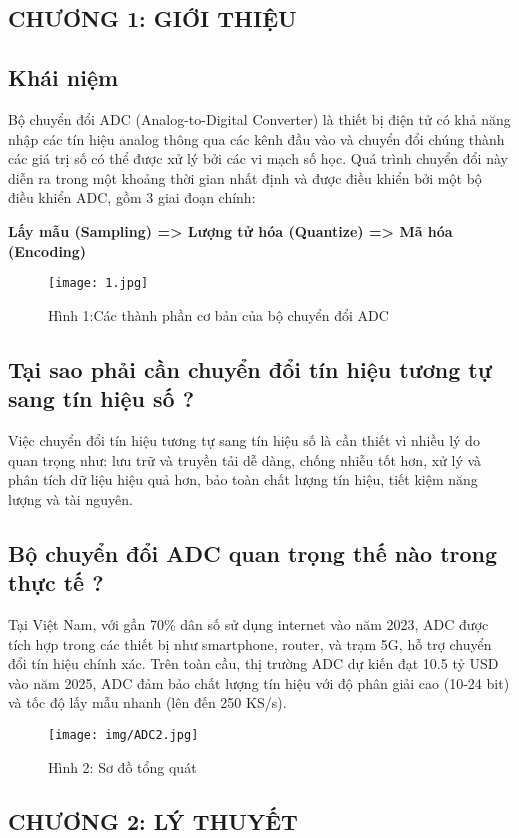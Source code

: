 \documentclass[a4paper,13pt]{article}
\begin{document}
\begin{center}
    \section{CHƯƠNG 1: GIỚI THIỆU}
\end{center}
\subsection{Khái niệm}
Bộ chuyển đổi ADC (Analog-to-Digital Converter) là thiết bị điện tử có khả năng nhập các tín hiệu analog thông qua các kênh đầu vào và chuyển đổi chúng thành các giá trị số có thể được xử lý bởi các vi mạch số học. Quá trình chuyển đổi này diễn ra trong một khoảng thời gian nhất định và được điều khiển bởi một bộ điều khiển ADC, gồm 3 giai đoạn chính: 
\begin{center}
    \textbf{Lấy mẫu (Sampling) => Lượng tử hóa (Quantize) => Mã hóa (Encoding)}
\end{center}
\begin{figure}[htbp]
    \centering
    \texttt{[image: 1.jpg]}
    \caption*{Hình 1:Các thành phần cơ bản của bộ chuyển đổi ADC \cite{key8} }
    \label{fig:model}
\end{figure}
\subsection{Tại sao phải cần chuyển đổi tín hiệu tương tự sang tín hiệu số ?}
Việc chuyển đổi tín hiệu tương tự sang tín hiệu số là cần thiết vì nhiều lý do quan trọng như: lưu trữ và truyền tải dễ dàng, chống nhiễu tốt hơn, xử lý và phân tích dữ liệu hiệu quả hơn, bảo toàn chất lượng tín hiệu, tiết kiệm năng lượng và tài nguyên.
\subsection{Bộ chuyển đổi ADC quan trọng thế nào trong thực tế ?}
Tại Việt Nam, với gần 70\% dân số sử dụng internet vào năm 2023, ADC được tích hợp trong các thiết bị như smartphone, router, và trạm 5G, hỗ trợ chuyển đổi tín hiệu chính xác. Trên toàn cầu, thị trường ADC dự kiến đạt 10.5 tỷ USD vào năm 2025, ADC đảm bảo chất lượng tín hiệu với độ phân giải cao (10-24 bit) và tốc độ lấy mẫu nhanh (lên đến 250 KS/s).
\begin{figure}[htbp]
    \centering
    \texttt{[image: img/ADC2.jpg]}
    \caption*{Hình 2: Sơ đồ tổng quát \cite{key6} }
    \label{fig:model}
\end{figure}
\clearpage
\begin{center}
    \section{CHƯƠNG 2: LÝ THUYẾT}
\end{center}
\end{document}
